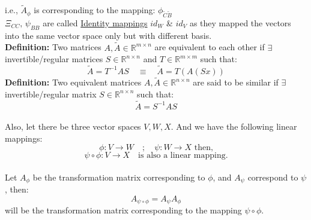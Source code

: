 \documentclass[12pt]{article}
\begin{document}
i.e., $\tilde{A}_\phi$ is corresponding to the mapping:
$
\phi_{\tilde{C}\tilde{B}}
$\\
\newline
$\Xi_{CC}, \, \psi_{BB}$ are called \underline{Identity mappings} ${id}_W$ \& ${id}_V$ as they mapped the vectors into the same vector space only but with different basis.\\
\newline
\textbf{Definition:} Two matrices $A, \tilde{A} \in \mathbb{R}^{m \times n}$ are equivalent to each other if $\exists$ invertible/regular matrices $S \in \mathbb{R}^{n \times n}$ and $T \in \mathbb{R}^{m \times m}$ such that:
$$
\tilde{A} = T^{-1} A S \quad \equiv\quad \tilde{A} =T(A(Sx))
$$
\newline
\textbf{Definition:} Two equivalent matrices $A, \tilde{A} \in \mathbb{R}^{n \times n}$ are said to be similar if $\exists$ invertible/regular matrix $S \in \mathbb{R}^{n \times n}$ such that:
$$
\tilde{A} = S^{-1} A S
$$
\\
Also, let there be three vector spaces $V, W, X$.  
And we have the following linear mappings:
$$
\phi : V \rightarrow W \quad ; \quad \psi : W \rightarrow X
\text{ then,}
$$
$$
\psi \circ \phi : V \rightarrow X \quad \text{is also a linear mapping.}
$$
\\
Let $A_\phi$ be the transformation matrix corresponding to $\phi$,  
and $A_\psi$ correspond to $\psi$, then:
$$
A_{\psi \circ \phi} = A_\psi A_\phi
$$
will be the transformation matrix corresponding to the mapping $\psi \circ \phi$.
\end{document}
